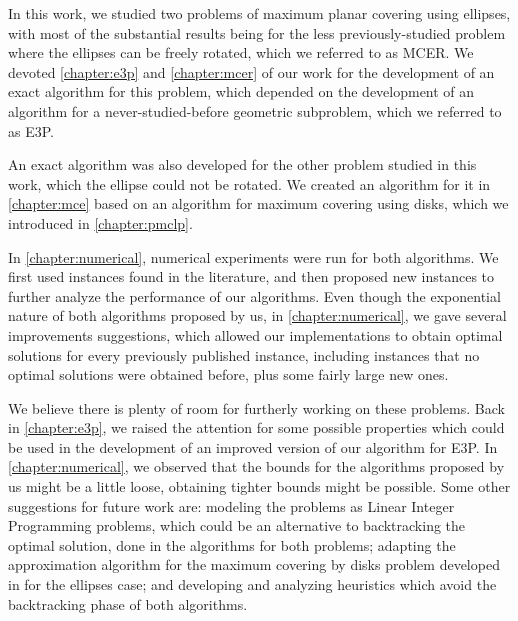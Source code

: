 In this work, we studied two problems of maximum planar covering using ellipses, with most of the substantial results being for the less previously-studied problem where the ellipses can be freely rotated, which we referred to as MCER. We devoted \autoref{chapter:e3p} and \autoref{chapter:mcer} of our work for the development of an exact algorithm for this problem, which depended on the development of an algorithm for a never-studied-before geometric subproblem, which we referred to as E3P. 

An exact algorithm was also developed for the other problem studied in this work, which the ellipse could not be rotated. We created an algorithm for it in \autoref{chapter:mce} based on an algorithm for maximum covering using disks, which we introduced in \autoref{chapter:pmclp}.

In \autoref{chapter:numerical}, numerical experiments were run for both algorithms. We first used instances found in the literature, and then proposed new instances to further analyze the performance of our algorithms.
Even though the exponential nature of both algorithms proposed by us, 
in \autoref{chapter:numerical}, we gave several improvements suggestions, which allowed our implementations to obtain optimal solutions for every previously published instance, including instances that no optimal solutions were obtained before, plus some fairly large new ones.


We believe there is plenty of room for furtherly working on these problems.
Back in \autoref{chapter:e3p}, we raised the attention for some possible properties which could be used in the development of an improved version of our algorithm for E3P.
In \autoref{chapter:numerical}, we observed that the bounds for the algorithms proposed by us might be a little loose, obtaining tighter bounds might be possible.
Some other suggestions for future work are: modeling the problems as Linear Integer Programming problems, which could be an alternative to backtracking the optimal solution, done in the algorithms for both problems; adapting the  approximation algorithm for the maximum covering by disks problem developed in  for the ellipses case; and developing and analyzing heuristics which avoid the backtracking phase of both algorithms.